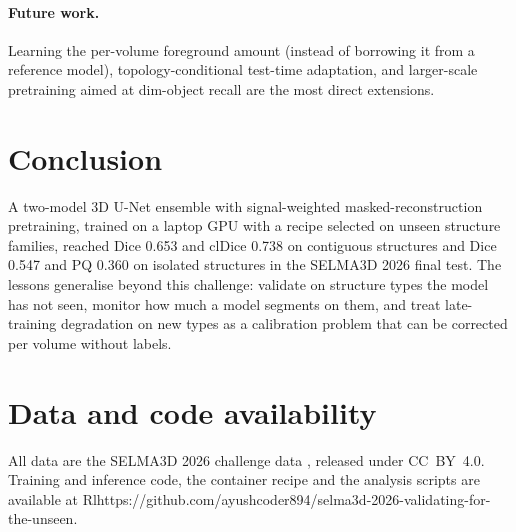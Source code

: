 \documentclass[11pt,a4paper]{article}
\begin{document}
\paragraph{Future work.} Learning the per-volume foreground amount (instead of borrowing it from a reference model), topology-conditional test-time adaptation, and larger-scale pretraining aimed at dim-object recall are the most direct extensions.

\section{Conclusion}
A two-model 3D U-Net ensemble with signal-weighted masked-reconstruction pretraining, trained on a laptop GPU with a recipe selected on unseen structure families, reached Dice 0.653 and clDice 0.738 on contiguous structures and Dice 0.547 and PQ 0.360 on isolated structures in the SELMA3D 2026 final test. The lessons generalise beyond this challenge: validate on structure types the model has not seen, monitor how much a model segments on them, and treat late-training degradation on new types as a calibration problem that can be corrected per volume without labels.

\section*{Data and code availability}
All data are the SELMA3D 2026 challenge data \cite{data2110,data2106,data3281,data3277}, released under CC~BY~4.0. Training and inference code, the container recipe and the analysis scripts are available at Rl{https://github.com/ayushcoder894/selma3d-2026-validating-for-the-unseen}.

\clearpage


\end{document}
